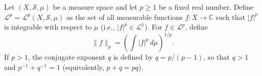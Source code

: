 Let $(X, \mathcal{S}, \mu)$ be a measure space and let $p \geq 1$ be a fixed real number. Define $\mathcal{L}^p = \mathcal{L}^p(X, \mathcal{S}, \mu)$ as the set of all measurable functions $f: X \to \mathbb{C}$ such that $|f|^p$ is integrable with respect to $\mu$ (i.e., $|f|^p \in \mathcal{L}^1$). For $f \in \mathcal{L}^p$, define
$$\|f\|_p = \left( \int |f|^p \, d\mu \right)^{1/p}.$$
If $p > 1$, the conjugate exponent $q$ is defined by $q = p/(p-1)$, so that $q > 1$ and $p^{-1} + q^{-1} = 1$ (equivalently, $p + q = pq$).
